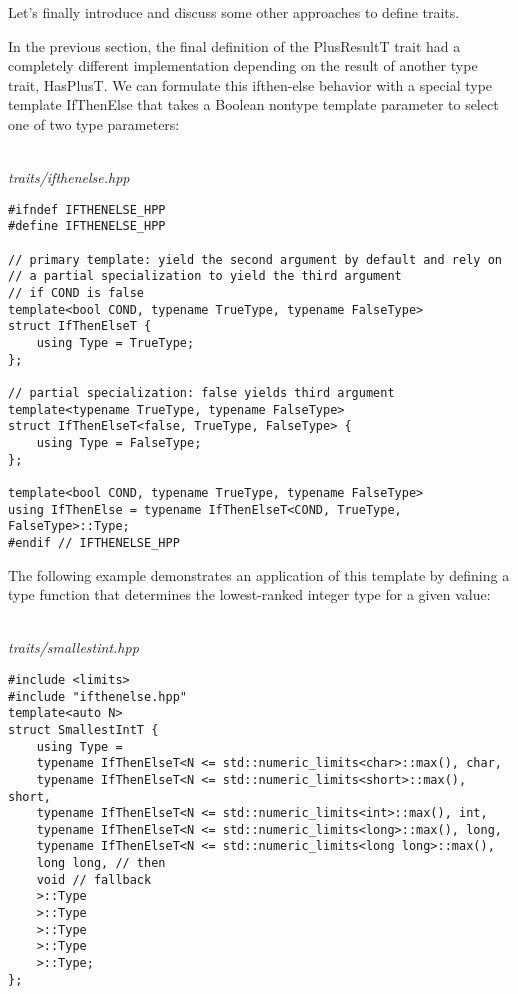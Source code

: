 
Let’s finally introduce and discuss some other approaches to define traits.


In the previous section, the final definition of the PlusResultT trait had a completely different implementation depending on the result of another type trait, HasPlusT. We can formulate this ifthen-else behavior with a special type template IfThenElse that takes a Boolean nontype template parameter to select one of two type parameters:

\hspace*{\fill} \\ %
\noindent
\textit{traits/ifthenelse.hpp}
\begin{lstlisting}[style=styleCXX]
#ifndef IFTHENELSE_HPP
#define IFTHENELSE_HPP

// primary template: yield the second argument by default and rely on
// a partial specialization to yield the third argument
// if COND is false
template<bool COND, typename TrueType, typename FalseType>
struct IfThenElseT {
	using Type = TrueType;
};

// partial specialization: false yields third argument
template<typename TrueType, typename FalseType>
struct IfThenElseT<false, TrueType, FalseType> {
	using Type = FalseType;
};

template<bool COND, typename TrueType, typename FalseType>
using IfThenElse = typename IfThenElseT<COND, TrueType, FalseType>::Type;
#endif // IFTHENELSE_HPP
\end{lstlisting}

The following example demonstrates an application of this template by defining a type function that determines the lowest-ranked integer type for a given value:

\hspace*{\fill} \\ %
\noindent
\textit{traits/smallestint.hpp}
\begin{lstlisting}[style=styleCXX]
#include <limits>
#include "ifthenelse.hpp"
template<auto N>
struct SmallestIntT {
	using Type =
	typename IfThenElseT<N <= std::numeric_limits<char>::max(), char,
	typename IfThenElseT<N <= std::numeric_limits<short>::max(), short,
	typename IfThenElseT<N <= std::numeric_limits<int>::max(), int,
	typename IfThenElseT<N <= std::numeric_limits<long>::max(), long,
	typename IfThenElseT<N <= std::numeric_limits<long long>::max(),
	long long, // then
	void // fallback
	>::Type
	>::Type
	>::Type
	>::Type
	>::Type;
};
\end{lstlisting}

